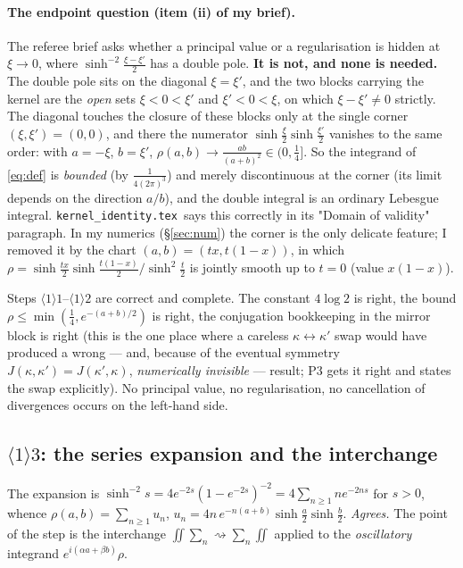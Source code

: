 \documentclass[11pt]{article}
\newcommand{\KI}{\texttt{kernel\_identity.tex}}\newcommand{\NOTE}{\texttt{universality\_normalization.tex}}
\begin{document}
\paragraph{The endpoint question (item (ii) of my brief).}
The referee brief asks whether a principal value or a regularisation is hidden at \(\xi\to0\),
where \(\sinh^{-2}\frac{\xi-\xi'}2\) has a double pole.  \textbf{It is not, and none is needed.}
The double pole sits on the diagonal \(\xi=\xi'\), and the two blocks carrying the kernel are the
\emph{open} sets \(\xi<0<\xi'\) and \(\xi'<0<\xi\), on which \(\xi-\xi'\neq0\) strictly.  The
diagonal touches the closure of these blocks only at the single corner \((\xi,\xi')=(0,0)\), and
there the numerator \(\sinh\frac\xi2\sinh\frac{\xi'}2\) vanishes to the same order: with
\(a=-\xi\), \(b=\xi'\), \(\rho(a,b)\to\frac{ab}{(a+b)^2}\in(0,\frac14]\).  So the integrand of
\eqref{eq:def} is \emph{bounded} (by \(\frac1{4(2\pi)^3}\)) and merely discontinuous at the corner
(its limit depends on the direction \(a/b\)), and the double integral is an ordinary Lebesgue
integral.  \KI\ says this correctly in its "Domain of validity" paragraph.  In my numerics
(\S\ref{sec:num}) the corner is the only delicate feature; I removed it by the chart
\((a,b)=(tx,t(1-x))\), in which \(\rho=\sinh\frac{tx}2\sinh\frac{t(1-x)}2/\sinh^2\frac t2\) is
jointly smooth up to \(t=0\) (value \(x(1-x)\)).

\begin{verdictok}
Steps \(\langle1\rangle1\)--\(\langle1\rangle2\) are correct and complete.  The constant \(4\log2\)
is right, the bound \(\rho\le\min(\frac14,e^{-(a+b)/2})\) is right, the conjugation bookkeeping in
the mirror block is right (this is the one place where a careless \(\kappa\leftrightarrow\kappa'\)
swap would have produced a wrong --- and, because of the eventual symmetry
\(J(\kappa,\kappa')=J(\kappa',\kappa)\), \emph{numerically invisible} --- result; P3 gets it right
and states the swap explicitly).  No principal value, no regularisation, no cancellation of
divergences occurs on the left-hand side.
\end{verdictok}

\subsection{\(\langle1\rangle3\): the series expansion and the interchange}

The expansion is \(\sinh^{-2}s=4e^{-2s}(1-e^{-2s})^{-2}=4\sum_{n\ge1}ne^{-2ns}\) for \(s>0\),
whence \(\rho(a,b)=\sum_{n\ge1}u_n\), \(u_n=4n\,e^{-n(a+b)}\sinh\frac a2\sinh\frac b2\).
\emph{Agrees.}  The point of the step is the interchange
\(\iint\sum_n\rightsquigarrow\sum_n\iint\) applied to the \emph{oscillatory} integrand
\(e^{i(\alpha a+\beta b)}\rho\).
\end{document}
